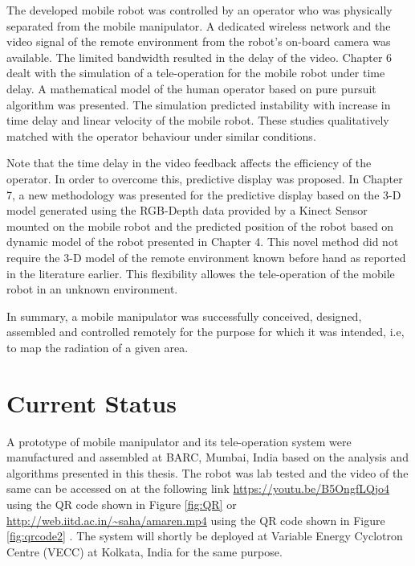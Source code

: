 The developed mobile robot was controlled by an operator who was  physically separated from the mobile manipulator. A dedicated wireless network and the video signal of the remote environment from the robot's on-board camera was available. The limited bandwidth resulted in the delay of the video. 
Chapter 6 dealt with the simulation of a tele-operation for the mobile robot under time delay.
 A mathematical model of the human operator based on pure pursuit algorithm was presented. 
 The simulation  predicted instability with increase in time delay and linear velocity of the mobile robot.
  These studies qualitatively matched with the operator behaviour under similar conditions.

   Note that the time delay in the video feedback affects the efficiency of the operator. 
   In order to overcome this, predictive display was proposed.
   In Chapter 7,  a new methodology was presented for the predictive display based on the 3-D model generated using the RGB-Depth data provided by a Kinect Sensor mounted on the mobile robot and the predicted position of the robot based on dynamic model of the robot presented in Chapter 4.
   This novel method did not require  the 3-D model of the remote environment known before hand as reported in the literature earlier.
   This flexibility allowes the tele-operation of  the mobile robot in an unknown environment. 
   
   In summary, a mobile manipulator was successfully conceived, designed, assembled and controlled remotely  for the purpose for which it was intended, i.e, to map the radiation of a given area.
   
   \section{Current Status} 
   A prototype of  mobile manipulator and its tele-operation system were   manufactured and assembled at BARC, Mumbai, India based on the analysis and algorithms presented in this thesis. The robot was lab tested and the video of the same can be accessed on at the following link \url{ https://youtu.be/B5OngfLQjo4} using the QR code shown in Figure \ref{fig:QR} or \url{http://web.iitd.ac.in/~saha/amaren.mp4} using the QR code shown in Figure \ref{fig:qrcode2} . The system will  shortly  be deployed at Variable Energy Cyclotron Centre (VECC) at Kolkata, India for the same purpose. 
   
